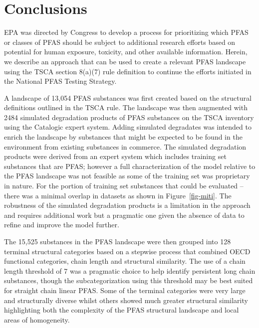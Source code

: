 \documentclass[
  super,
  preprint,
  3p]{elsarticle}
\begin{document}
\hypertarget{conclusions}{%
\section{Conclusions}\label{conclusions}}

EPA was directed by Congress to develop a process for prioritizing which
PFAS or classes of PFAS should be subject to additional research efforts
based on potential for human exposure, toxicity, and other available
information. Herein, we describe an approach that can be used to create
a relevant PFAS landscape using the TSCA section 8(a)(7) rule definition
to continue the efforts initiated in the National PFAS Testing Strategy.

A landscape of 13,054 PFAS substances was first created based on the
structural definitions outlined in the TSCA rule. The landscape was then
augmented with 2484 simulated degradation products of PFAS substances on
the TSCA inventory using the Catalogic expert system. Adding simulated
degradates was intended to enrich the landscape by substances that might
be expected to be found in the environment from existing substances in
commerce. The simulated degradation products were derived from an expert
system which includes training set substances that are PFAS; however a
full characterization of the model relative to the PFAS landscape was
not feasible as some of the training set was proprietary in nature. For
the portion of training set substances that could be evaluated -- there
was a minimal overlap in datasets as shown in Figure~\ref{fig-miti}. The
robustness of the simulated degradation products is a limitation in the
approach and requires additional work but a pragmatic one given the
absence of data to refine and improve the model further.

The 15,525 substances in the PFAS landscape were then grouped into 128
terminal structural categories based on a stepwise process that combined
OECD functional categories, chain length and structural similarity. The
use of a chain length threshold of 7 was a pragmatic choice to help
identify persistent long chain substances, though the subcategorization
using this threshold may be best suited for straight chain linear PFAS.
Some of the terminal categories were very large and structurally diverse
whilst others showed much greater structural similarity highlighting
both the complexity of the PFAS structural landscape and local areas of
homogeneity.
\end{document}
